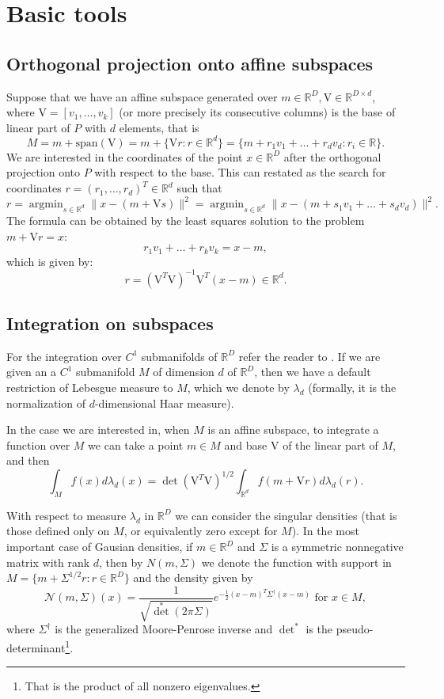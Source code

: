 \documentclass[12pt]{article}
\def\R{\mathbb{R}}
\def\v{\mathrm{V}}
\def\span{\mathrm{span}}
\def\nor{\mathcal{N}}
\DeclareMathOperator*{\argmin}{argmin}
\theoremstyle{definition}
\begin{document}

\section{Basic tools}


\subsection{Orthogonal projection onto affine subspaces}

Suppose that we have an affine subspace generated over $m \in \R^D,\v \in \R^{D \times d}$, where 
$\v=[v_1,\ldots,v_k]$ (or more precisely its consecutive columns) is the base of linear part of $P$ with $d$ elements, that is
$$
M=m+\span (\v)=m+\{\v r:r \in \R^d\}=\{m+r_1v_1+\ldots+r_dv_d: r_i \in \R\}.
$$
We are interested in the coordinates of the point $x \in \R^D$ after the orthogonal
projection onto $P$ with respect to the base.
This can restated as the search for coordinates $r=(r_1,\ldots,r_d)^T \in \R^d$
such that
$$
r=\argmin_{s \in \R^d} \|x-(m+\v s)\|^2=\argmin_{s \in \R^d} \|x-(m+s_1v_1+\ldots+s_dv_d)\|^2.
$$
The formula can be obtained by the least squares solution to the problem $m+\v r=x$:
$$
r_1v_1+\ldots+r_kv_k=x-m,
$$
which is given by:
$$
r=(\v^T\v)^{-1}\v^T(x-m) \in \R^d.
$$


\subsection{Integration on subspaces}

For the integration over $C^1$ submanifolds of $\R^D$ refer the reader to  \cite{munkres1997analysis, federer2014geometric}. If we are given an a $C^1$ submanifold $M$  of dimension $d$ of $\R^D$, then we have a default restriction of Lebesgue measure to $M$, which we denote by $\lambda_d$ (formally, it is the normalization of $d$-dimensional Haar measure).

In the case we are interested in, when $M$ is an affine subspace, to integrate
a function over $M$ we can take a point $m \in M$ and base $\v$ of the linear part
of $M$, and then
$$
\int_M f(x) d\lambda_d(x)=\det(\v^T\v)^{1/2} \int_{\R^d} f(m+\v r) d\lambda_d(r).
$$

With respect to measure $\lambda_d$ in $\R^D$ we can consider the 
singular densities (that is those defined only on $M$, or equivalently zero 
except for $M$). In the most important case of Gausian densities, if $m \in \R^D$ and $\Sigma$ is a symmetric nonnegative 
matrix with rank $d$, then by $N(m,\Sigma)$ we denote the function with support
in $M=\{m+\Sigma^{1/2}r : r\in \R^D\}$ and the density given by
$$
\nor(m,\Sigma)(x)=\frac{1}{\sqrt{\det^{*}(2\pi \Sigma )}} e^{-\frac{1}{2}(x -m)^T{\Sigma }^\dagger (x -m)} \text{ for } x \in M,
$$
where $\Sigma^\dagger$ is the generalized Moore-Penrose inverse and $\det^*$ is the pseudo-determinant\footnote{That is the product of all nonzero eigenvalues.}.
\end{document}
